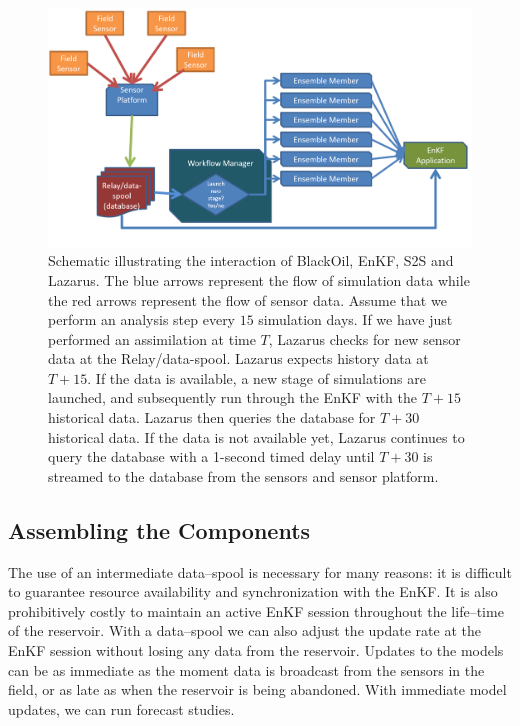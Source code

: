 \documentclass{acm_proc_article-sp}
\begin{document}
\begin{figure}
\begin{center}
 \includegraphics*[scale=0.4,angle=0]{figures/DetailedSensorFlow.png}
\end{center}
\caption{Schematic illustrating the interaction of BlackOil, EnKF, S2S
  and Lazarus. The blue arrows represent the flow of simulation data
  while the red arrows represent the flow of sensor
  data. Assume that we perform an analysis step every $15$ simulation days. If
  we have just performed an assimilation at time $T$, Lazarus checks
  for new sensor data at the Relay/data-spool. Lazarus expects history
  data at $T+15$. If the data is available, a new stage of simulations are launched,
  and subsequently run through the EnKF with the $T+15$ historical data. Lazarus
  then queries the database for $T+30$ historical data. If the data is not available yet,
  Lazarus continues to query the database with a 1-second timed delay until $T+30$ is
  streamed to the database from the sensors and sensor platform. }
\label{fig:SensorRelay}
\end{figure}

\subsection{Assembling the Components } The use of an
intermediate data--spool is necessary for many reasons: it is
difficult to guarantee resource availability and synchronization with
the EnKF. It is also prohibitively costly to maintain an active EnKF
session throughout the life--time of the reservoir. With a data--spool
we can also adjust the update rate at the EnKF session without losing
any data from the reservoir. Updates to the models can be as immediate
as the moment data is broadcast from the sensors in the field, or as
late as when the reservoir is being abandoned. With immediate model
updates, we can run forecast studies.
\end{document}
